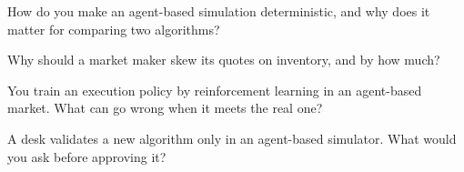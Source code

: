 \begin{interviewq}\label{iq:mx:build-an-agent-based-market:3}
How do you make an agent-based simulation deterministic, and why does it matter for comparing two algorithms?
\end{interviewq}

\begin{interviewq}\label{iq:mx:build-an-agent-based-market:4}
Why should a market maker skew its quotes on inventory, and by how much?
\end{interviewq}

\begin{interviewq}\label{iq:mx:build-an-agent-based-market:5}
You train an execution policy by reinforcement learning in an agent-based market. What can go wrong when it meets the real one?
\end{interviewq}

\begin{interviewq}\label{iq:mx:build-an-agent-based-market:6}
A desk validates a new algorithm only in an agent-based simulator. What would you ask before approving it?
\end{interviewq}
